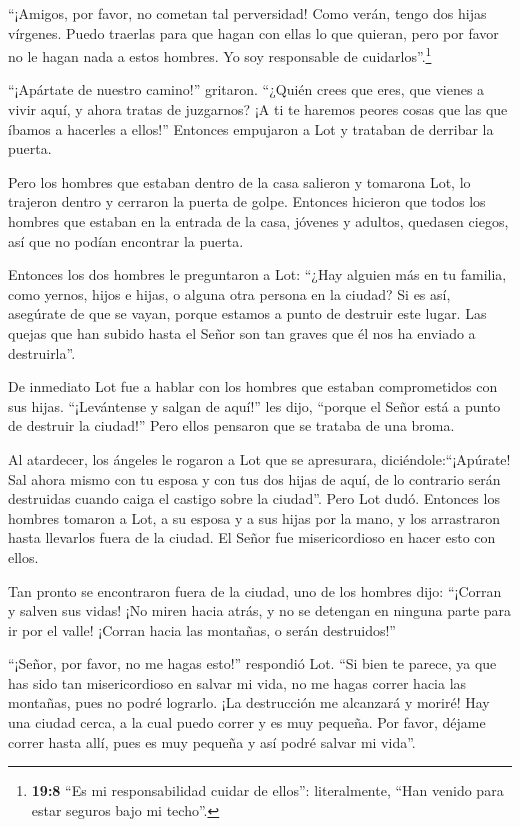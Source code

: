  ``¡Amigos, por favor, no cometan tal perversidad!
 Como verán, tengo dos hijas vírgenes. Puedo traerlas para
que hagan con ellas lo que quieran, pero por favor no le hagan nada a
estos hombres. Yo soy responsable de cuidarlos''.\footnote{\textbf{19:8}
  ``Es mi responsabilidad cuidar de ellos'': literalmente, ``Han venido
  para estar seguros bajo mi techo''.}

 ``¡Apártate de nuestro camino!'' gritaron. ``¿Quién crees
que eres, que vienes a vivir aquí, y ahora tratas de juzgarnos? ¡A ti te
haremos peores cosas que las que íbamos a hacerles a ellos!'' Entonces
empujaron a Lot y trataban de derribar la puerta.

 Pero los hombres que estaban dentro de la casa salieron y
tomarona Lot, lo trajeron dentro y cerraron la puerta de golpe.
 Entonces hicieron que todos los hombres que estaban en la
entrada de la casa, jóvenes y adultos, quedasen ciegos, así que no
podían encontrar la puerta.

 Entonces los dos hombres le preguntaron a Lot: ``¿Hay
alguien más en tu familia, como yernos, hijos e hijas, o alguna otra
persona en la ciudad? Si es así, asegúrate de que se vayan,
 porque estamos a punto de destruir este lugar. Las quejas
que han subido hasta el Señor son tan graves que él nos ha enviado a
destruirla''.

 De inmediato Lot fue a hablar con los hombres que estaban
comprometidos con sus hijas. ``¡Levántense y salgan de aquí!'' les dijo,
``porque el Señor está a punto de destruir la ciudad!'' Pero ellos
pensaron que se trataba de una broma.

 Al atardecer, los ángeles le rogaron a Lot que se
apresurara, diciéndole:``¡Apúrate! Sal ahora mismo con tu esposa y con
tus dos hijas de aquí, de lo contrario serán destruidas cuando caiga el
castigo sobre la ciudad''.  Pero Lot dudó. Entonces los
hombres tomaron a Lot, a su esposa y a sus hijas por la mano, y los
arrastraron hasta llevarlos fuera de la ciudad. El Señor fue
misericordioso en hacer esto con ellos.

 Tan pronto se encontraron fuera de la ciudad, uno de los
hombres dijo: ``¡Corran y salven sus vidas! ¡No miren hacia atrás, y no
se detengan en ninguna parte para ir por el valle! ¡Corran hacia las
montañas, o serán destruidos!''

 ``¡Señor, por favor, no me hagas esto!'' respondió Lot.
 ``Si bien te parece, ya que has sido tan misericordioso en
salvar mi vida, no me hagas correr hacia las montañas, pues no podré
lograrlo. ¡La destrucción me alcanzará y moriré!  Hay una
ciudad cerca, a la cual puedo correr y es muy pequeña. Por favor, déjame
correr hasta allí, pues es muy pequeña y así podré salvar mi vida''.

